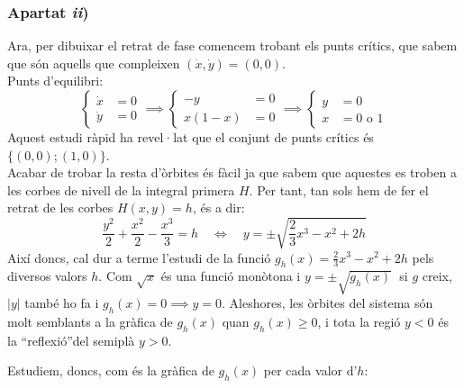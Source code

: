 \documentclass[10pt,a4paper]{article}
\begin{document}
\subsubsection*{Apartat \emph{ii})}
Ara, per dibuixar el retrat de fase comencem trobant els punts crítics, que sabem que són aquells que compleixen $(\dot{x},\dot{y})=(0,0)$.\\
Punts d'equilibri:
$$
  \left\lbrace \begin{aligned}
    \dot{x} & =0 \\
    \dot{y} & =0
  \end{aligned}\right.\implies
  \left\lbrace \begin{aligned}
    -y     & =0 \\
    x(1-x) & =0
  \end{aligned}\right.\implies
  \left\lbrace \begin{aligned}
    y & =0            \\
    x & =0\text{ o }1
  \end{aligned}\right.
$$
Aquest estudi ràpid ha revel·lat que el conjunt de punts crítics és $\{(0,0);(1,0)\}$.
\\Acabar de trobar la resta d'òrbites és fàcil ja que sabem que aquestes es troben a les corbes de nivell de la integral primera $H$. Per tant, tan sols hem de fer el retrat de les corbes $H(x,y)=h$, és a dir:
\begin{equation}
  \frac{y^2}{2}+\frac{x^2}{2}-\frac{x^3}{3}=h\quad\Longleftrightarrow\quad
  y=\pm\sqrt{\frac{2}{3}x^3-x^2+2h}
\end{equation}
Així doncs, cal dur a terme l'estudi de la funció $g_h(x)=\frac{2}{3}x^3-x^2+2h$ pels diversos valors $h$. Com $\sqrt{x}$ és una funció monòtona i $y=\pm\sqrt{g_h(x)}\;$ si $g$ creix, $|y|$ també ho fa i $g_h(x)=0\implies y=0$. Aleshores, les òrbites del sistema són molt semblants a la gràfica de $g_h(x)$ quan $g_h(x)\geq0$, i tota la regió $y<0$ és la \textquotedblleft reflexió\textquotedblright del semiplà $y>0$.

Estudiem, doncs, com és la gràfica de $g_h(x)$ per cada valor d'$h$:
\end{document}

